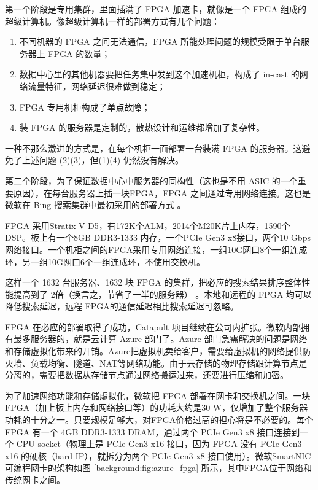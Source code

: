 第一个阶段是专用集群，里面插满了 FPGA 加速卡，就像是一个 FPGA 组成的超级计算机。像超级计算机一样的部署方式有几个问题：

\begin{enumerate}
	\item 不同机器的 FPGA 之间无法通信，FPGA 所能处理问题的规模受限于单台服务器上 FPGA 的数量；
	\item 数据中心里的其他机器要把任务集中发到这个加速机柜，构成了 in-cast 的网络流量特征，网络延迟很难做到稳定；
	\item FPGA 专用机柜构成了单点故障；
	\item 装 FPGA 的服务器是定制的，散热设计和运维都增加了复杂性。
\end{enumerate}

一种不那么激进的方式是，在每个机柜一面部署一台装满 FPGA 的服务器。这避免了上述问题 (2)(3)，但(1)(4) 仍然没有解决。

第二个阶段，为了保证数据中心中服务器的同构性（这也是不用 ASIC 的一个重要原因），在每台服务器上插一块FPGA，FPGA 之间通过专用网络连接。这也是微软在 Bing 搜索集群中最初采用的部署方式 \cite{putnam2014reconfigurable}。

FPGA 采用Stratix V D5，有172K个ALM，2014个M20K片上内存，1590个 DSP。板上有一个8GB DDR3-1333 内存，一个PCIe Gen3 x8接口，两个10 Gbps网络接口。一个机柜之间的FPGA采用专用网络连接，一组10G网口8个一组连成环，另一组10G网口6个一组连成环，不使用交换机。

这样一个 1632 台服务器、1632 块 FPGA 的集群，把必应的搜索结果排序整体性能提高到了 2倍（换言之，节省了一半的服务器） \cite{putnam2014reconfigurable}。本地和远程的 FPGA 均可以降低搜索延迟，远程 FPGA的通信延迟相比搜索延迟可忽略。

FPGA 在必应的部署取得了成功，Catapult 项目继续在公司内扩张。微软内部拥有最多服务器的，就是云计算 Azure 部门了。Azure 部门急需解决的问题是网络和存储虚拟化带来的开销。Azure把虚拟机卖给客户，需要给虚拟机的网络提供防火墙、负载均衡、隧道、NAT等网络功能。由于云存储的物理存储跟计算节点是分离的，需要把数据从存储节点通过网络搬运过来，还要进行压缩和加密。

为了加速网络功能和存储虚拟化，微软把 FPGA 部署在网卡和交换机之间。一块 FPGA（加上板上内存和网络接口等）的功耗大约是30 W，仅增加了整个服务器功耗的十分之一。只要规模足够大，对FPGA价格过高的担心将是不必要的。每个 FPGA 有一个 4GB DDR3-1333 DRAM，通过两个 PCIe Gen3 x8 接口连接到一个 CPU socket（物理上是 PCIe Gen3 x16 接口，因为 FPGA 没有 PCIe Gen3 x16 的硬核（hard IP），就拆分为两个 PCIe Gen3 x8 接口使用）。微软SmartNIC可编程网卡的架构如图 \ref{background:fig:azure_fpga} 所示，其中FPGA位于网络和传统网卡之间。

